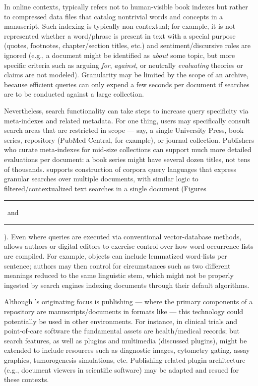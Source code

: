 \documentclass[11pt]{article}
\newcommand\reduline{\bgroup\markoverwith
{\textcolor{ru}{\rule[-.25ex]{3pt}{3.4pt}}}\ULon}
\DeclareRobustCommand{\xfigunderline}[1]{\reduline{#1}
\llap{\dashuline{\phantom{#1}}}%
}
\renewcommand{\Atref}[1]{\textcolor{rgrAt!30}{\xfigunderline{\hspace{-2pt}\autoref{#1}\hspace*{-2pt}}}}
\begin{document}
{{\begin{description}
\par\noindent\vspace*{-24.5pt}%
\enlargethispage{4em}

\item[Academic Search Engines]  In online contexts,  typically 
refers not to human-visible book indexes but rather to 
compressed data files that catalog nontrivial words 
and concepts in a manuscript.  Such indexing is typically 
non-contextual; for example, it is not represented whether a 
word/phrase is present in text with a special purpose 
(quotes, footnotes, chapter/section titles, etc.) and 
sentiment/discursive roles are ignored (e.g., a document might be identified as 
\textit{about} some topic, but more specific criteria 
such as arguing \textit{for}, \textit{against}, or neutrally 
\textit{evaluating} theories or claims are not modeled).  
Granularity may be limited by the scope of an archive, because 
efficient queries can only expend a few seconds per 
document if searches are to be conducted against a large collection.  

\pseudoIndent{} Nevertheless, search functionality can take 
steps to increase query specificity via meta-indexes and 
related metadata.  For one thing, users may specifically 
consult search areas that are restricted in scope --- say, a single 
University Press, book series, repository (PubMed Central, for example), 
or journal collection.  Publishers who curate meta-indexes 
for mid-size collections can support much more detailed 
evaluations per document: a book series might have several 
dozen titles, not tens of thousands.  \lPacTk{} supports 
construction of corpora query languages that express 
granular searches over multiple documents, with 
similar logic to filtered/contextualized text searches 
in a single \PDF{} document (Figures~\Atref{fig:ss6}~and~\Atref{fig:ss7}).
Even where queries are executed via conventional 
vector-database methods, \PacTk{} allows authors or digital editors 
to exercise control over how word-occurrence lists are compiled.  
For example, \TSOM{} objects can include lemmatized word-lists 
per sentence; authors may then control for 
circumstances such as two different meanings reduced to the 
same linguistic stem, which might not be properly 
ingested by search engines indexing documents 
through their default algorithms.

\pseudoIndent{} Although \lPacTk{}'s originating focus is publishing 
--- where the primary components of a repository are 
manuscripts/documents in formats like \PDF{} --- this technology 
could potentially be used in other environments.  For instance, 
in clinical trials and point-of-care software the fundamental assets 
are health/medical records; but search features, 
as well as plugins and multimedia (discussed plugins),
might be extended to include resources such as diagnostic 
images, cytometry gating, assay graphics, 
tumorogenesis simulations, etc.  Publishing-related plugin architecture 
(e.g., document viewers in scientific software) may be 
adapted and resued for these \EHR{} contexts.\clearpage


\end{description}}}
\end{document}
